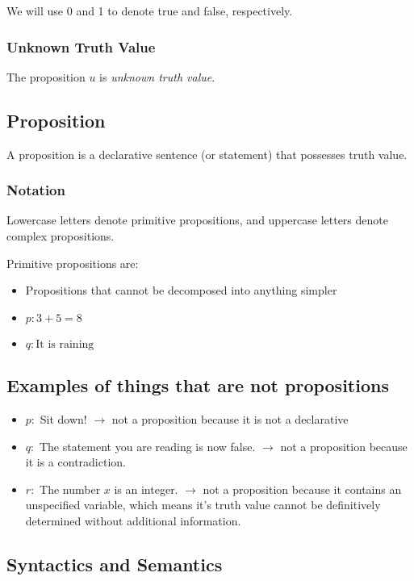 \documentclass[12pt]{article}
\begin{document}
We will use 0 and 1 to denote true and false, respectively.

\subsubsection{Unknown Truth Value}

The proposition $u$ is \textit{unknown truth value}.

\subsection{Proposition}

A proposition is a declarative sentence (or statement) that possesses truth value.

\subsubsection{Notation}

Lowercase letters denote primitive propositions, and uppercase letters denote
complex propositions.

Primitive propositions are:

\begin{itemize}
\item Propositions that cannot be decomposed into anything simpler
\item $p: 3 + 5 = 8$
\item $q: \text{It is raining}$
\end{itemize}

\subsection{Examples of things that are not propositions}

\begin{itemize}
\item $p:$ Sit down! $\to$ not a proposition because it is not a declarative
\item $q:$ The statement you are reading is now false. $\to$ not a proposition
  because it is a contradiction.
\item $r:$ The number $x$ is an integer. $\to$ not a proposition because it 
  contains an unspecified variable, which means it's truth value cannot be
  definitively determined without additional information.
\end{itemize}

\subsection{Syntactics and Semantics}
\end{document}
